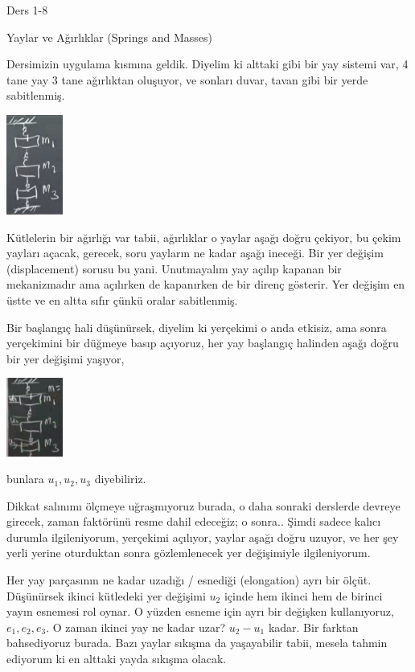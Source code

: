 \documentclass[12pt,fleqn]{article}\usepackage{../../common}
\begin{document}
Ders 1-8

Yaylar ve Ağırlıklar (Springs and Masses)

Dersimizin uygulama kısmına geldik. Diyelim ki alttaki gibi bir yay sistemi var,
4 tane yay 3 tane ağırlıktan oluşuyor, ve sonları duvar, tavan gibi bir yerde
sabitlenmiş.

\includegraphics[width=5em]{compscieng_1_08_01.png}

Kütlelerin bir ağırlığı var tabii, ağırlıklar o yaylar aşağı doğru çekiyor, bu
çekim yayları açacak, gerecek, soru yayların ne kadar aşağı ineceği.  Bir yer
değişim (displacement) sorusu bu yani. Unutmayalım yay açılıp kapanan bir
mekanizmadır ama açılırken de kapanırken de bir direnç gösterir. Yer değişim en
üstte ve en altta sıfır çünkü oralar sabitlenmiş.

Bir başlangıç hali düşünürsek, diyelim ki yerçekimi o anda etkisiz, ama sonra
yerçekimini bir düğmeye basıp açıyoruz, her yay başlangıç halinden aşağı
doğru bir yer değişimi yaşıyor, 

\includegraphics[width=5em]{compscieng_1_08_02.png}

bunlara $u_1,u_2,u_3$ diyebiliriz.

Dikkat salınımı ölçmeye uğraşmıyoruz burada, o daha sonraki derslerde devreye
girecek, zaman faktörünü resme dahil edeceğiz; o sonra.. Şimdi sadece kalıcı
durumla ilgileniyorum, yerçekimi açılıyor, yaylar aşağı doğru uzuyor, ve her şey
yerli yerine oturduktan sonra gözlemlenecek yer değişimiyle ilgileniyorum.

Her yay parçasının ne kadar uzadığı / esnediği (elongation) ayrı bir ölçüt.
Düşünürsek ikinci kütledeki yer değişimi $u_2$ içinde hem ikinci hem de birinci
yayın esnemesi rol oynar. O yüzden esneme için ayrı bir değişken kullanıyoruz,
$e_1,e_2,e_3$. O zaman ikinci yay ne kadar uzar? $u_2-u_1$ kadar. Bir farktan
bahsediyoruz burada. Bazı yaylar sıkışma da yaşayabilir tabii, mesela tahmin
ediyorum ki en alttaki yayda sıkışma olacak.
\end{document}
